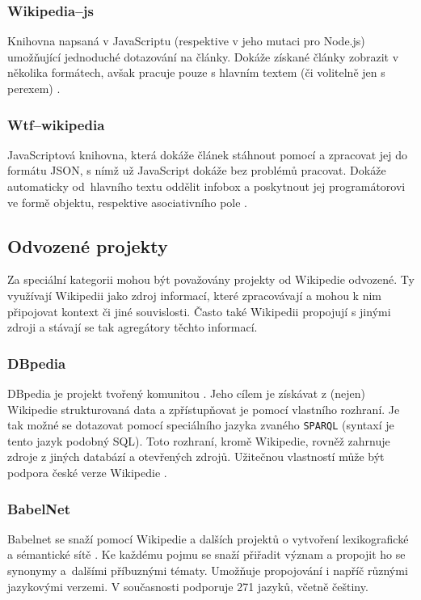 \subsubsection{Wikipedia--js}
Knihovna napsaná v JavaScriptu (respektive v jeho mutaci pro Node.js) umožňující jednoduché dotazování na články. Dokáže získané články zobrazit v několika formátech, avšak pracuje pouze s hlavním textem (či volitelně jen s perexem) \cite{wikipediajs}.
\subsubsection{Wtf--wikipedia}
JavaScriptová knihovna, která dokáže článek stáhnout pomocí  a zpracovat jej do formátu JSON, s nímž už JavaScript dokáže bez problémů pracovat. Dokáže automaticky od~hlavního textu oddělit infobox a poskytnout jej programátorovi ve formě objektu, respektive asociativního pole \cite{wtfwikipedia}.

\subsection{Odvozené projekty}
Za speciální kategorii mohou být považovány projekty od Wikipedie odvozené. Ty využívají Wikipedii jako zdroj informací, které zpracovávají a mohou k nim připojovat kontext či jiné souvislosti. Často také Wikipedii propojují s jinými zdroji a stávají se tak agregátory těchto informací.

\subsubsection{DBpedia}
DBpedia je projekt tvořený komunitou \cite{dbpedia}. Jeho cílem je získávat z (nejen) Wikipedie strukturovaná data a zpřístupňovat je pomocí vlastního rozhraní. Je tak možné se  dotazovat pomocí speciálního jazyka zvaného \texttt{SPARQL} (syntaxí je tento jazyk podobný SQL). Toto rozhraní, kromě Wikipedie, rovněž zahrnuje zdroje z jiných databází a otevřených zdrojů. Užitečnou vlastností může být podpora české verze Wikipedie \cite{csdbpedia}.
\subsubsection{BabelNet}
Babelnet se snaží pomocí Wikipedie a dalších projektů o vytvoření lexikografické a sémantické sítě \cite{babelnet}. Ke každému pojmu se snaží přiřadit význam a propojit ho se synonymy a~dalšími příbuznými tématy. Umožňuje propojování i napříč různými jazykovými verzemi. V současnosti podporuje 271 jazyků, včetně češtiny.
